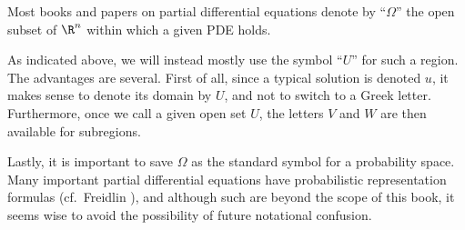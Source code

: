 \begin{remark}
\label{rem:domain-notation-choice-u}
Most books and papers on partial differential equations denote by ``$\Omega$'' the open subset of $\R^n$ within which a given PDE holds.

As indicated above, we will instead mostly use the symbol ``$U$'' for such a region. The advantages are several. First of all, since a typical solution is denoted $u$, it makes sense to denote its domain by $U$, and not to switch to a Greek letter. Furthermore, once we call a given open set $U$, the letters $V$ and $W$ are then available for subregions.

Lastly, it is important to save $\Omega$ as the standard symbol for a probability space. Many important partial differential equations have probabilistic representation formulas (cf.\ Freidlin \cite{Freidlin1985}), and although such are beyond the scope of this book, it seems wise to avoid the possibility of future notational confusion.
\end{remark}
